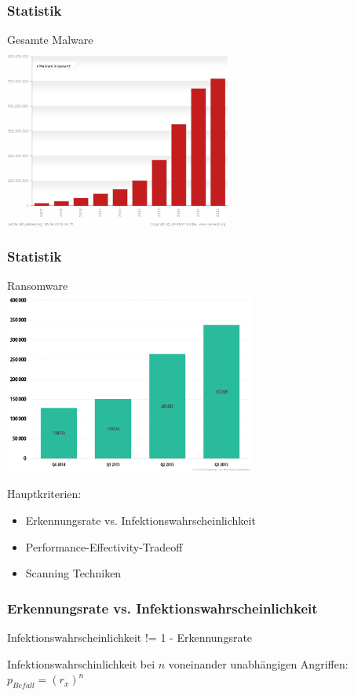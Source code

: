 \documentclass{beamer}
\begin{document}
\begin{frame}
\frametitle{Statistik}
Gesamte Malware \\
\includegraphics[height=6cm]{bilder/total.png}

\end{frame}

\begin{frame}
\frametitle{Statistik}
Ransomware \\
\includegraphics[height=6cm]{bilder/ransom.png}

\end{frame}


\begin{frame}
Hauptkriterien:
\begin{itemize}
	\item Erkennungsrate vs. Infektionswahrscheinlichkeit
	\item Performance-Effectivity-Tradeoff
	\item Scanning Techniken
\end{itemize}
\end{frame}

\begin{frame}
\frametitle{Erkennungsrate vs. Infektionswahrscheinlichkeit}
\begin{block}{}
	Infektionswahrscheinlichkeit != 1 - Erkennungsrate
\end{block}
Infektionswahrschinlichkeit bei $n$ voneinander unabhängigen Angriffen: \\
\centering
$p_{Befall} = (r_x)^n$
\end{frame}
\end{document}
